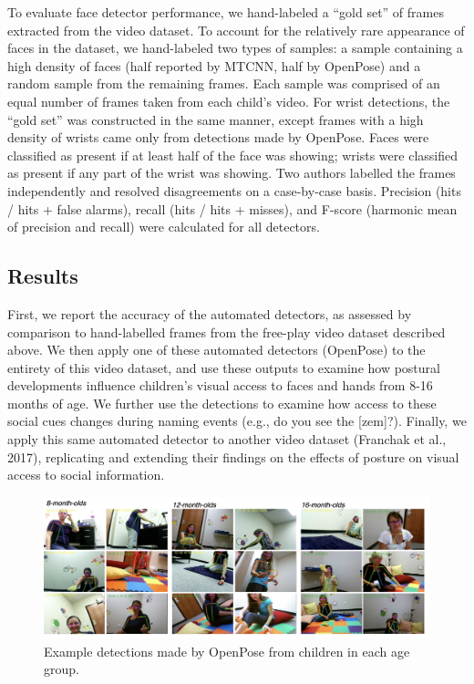 \documentclass[english,man]{apa6}
\begin{document}
To evaluate face detector performance, we hand-labeled a \enquote{gold
set} of frames extracted from the video dataset. To account for the
relatively rare appearance of faces in the dataset, we hand-labeled two
types of samples: a sample containing a high density of faces (half
reported by MTCNN, half by OpenPose) and a random sample from the
remaining frames. Each sample was comprised of an equal number of frames
taken from each child's video. For wrist detections, the \enquote{gold
set} was constructed in the same manner, except frames with a high
density of wrists came only from detections made by OpenPose. Faces were
classified as present if at least half of the face was showing; wrists
were classified as present if any part of the wrist was showing. Two
authors labelled the frames independently and resolved disagreements on
a case-by-case basis. Precision (hits / hits + false alarms), recall
(hits / hits + misses), and F-score (harmonic mean of precision and
recall) were calculated for all detectors.

\subsection{Results}\label{results}

First, we report the accuracy of the automated detectors, as assessed by
comparison to hand-labelled frames from the free-play video dataset
described above. We then apply one of these automated detectors
(OpenPose) to the entirety of this video dataset, and use these outputs
to examine how postural developments influence children's visual access
to faces and hands from 8-16 months of age. We further use the
detections to examine how access to these social cues changes during
naming events (e.g., do you see the {[}zem{]}?). Finally, we apply this
same automated detector to another video dataset (Franchak et al.,
2017), replicating and extending their findings on the effects of
posture on visual access to social information.

\begin{figure}[H]
\includegraphics[width=1\linewidth]{images/exampe_detections} \caption{Example detections made by OpenPose from children in each age group.}\label{fig:exampledetections}
\end{figure}
\end{document}
